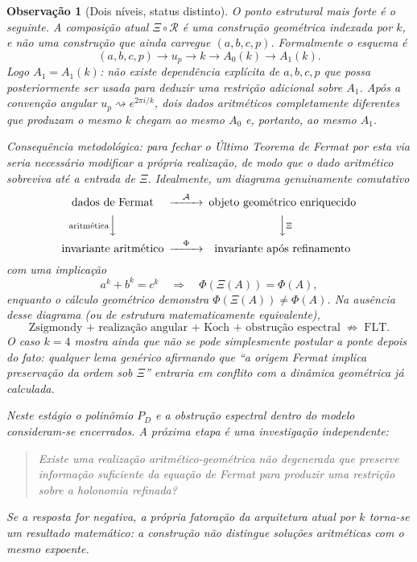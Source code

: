 \documentclass[11pt,a4paper]{article}
\newtheorem{observacao}[teorema]{Observação}
\begin{document}
\begin{observacao}[Dois níveis, status distinto]
O ponto estrutural mais forte é o seguinte. A composição atual \(\Xi\circ\mathcal{R}\) é uma construção geométrica indexada por \(k\), e não uma construção que ainda carregue \((a,b,c,p)\). Formalmente o esquema é
\[
(a,b,c,p)\longrightarrow u_p\longrightarrow k\longrightarrow A_0(k)\longrightarrow A_1(k).
\]
Logo \(A_1=A_1(k)\): não existe dependência explícita de \(a,b,c,p\) que possa posteriormente ser usada para deduzir uma restrição adicional sobre \(A_1\). Após a convenção angular \(u_p\rightsquigarrow e^{2\pi i/k}\), dois dados aritméticos completamente diferentes que produzam o mesmo \(k\) chegam ao mesmo \(A_0\) e, portanto, ao mesmo \(A_1\).

Consequência metodológica: para fechar o Último Teorema de Fermat por esta via seria necessário modificar a própria realização, de modo que o dado aritmético sobreviva até a entrada de \(\Xi\). Idealmente, um diagrama genuinamente comutativo
\[
\begin{CD}
\text{dados de Fermat}@>{\mathcal{A}}>>\text{objeto geométrico enriquecido}\\
@V{\text{aritmética}}VV@VV{\Xi}V\\
\text{invariante aritmético}@>{\Phi}>>\text{invariante após refinamento}
\end{CD}
\]
com uma implicação
\[
a^k+b^k=c^k\quad\Longrightarrow\quad\Phi(\Xi(A))=\Phi(A),
\]
enquanto o cálculo geométrico demonstra \(\Phi(\Xi(A))\neq\Phi(A)\). Na ausência desse diagrama (ou de estrutura matematicamente equivalente),
\[
\text{Zsigmondy + realização angular + Koch + obstrução espectral}\;\not\Rightarrow\;\text{FLT}.
\]
O caso \(k=4\) mostra ainda que não se pode simplesmente postular a ponte depois do fato: qualquer lema genérico afirmando que ``a origem Fermat implica preservação da ordem sob \(\Xi\)'' entraria em conflito com a dinâmica geométrica já calculada.

Neste estágio o polinômio \(P_D\) e a obstrução espectral dentro do modelo consideram-se encerrados. A próxima etapa é uma investigação independente:
\begin{quote}
Existe uma realização aritmético-geométrica não degenerada que preserve informação suficiente da equação de Fermat para produzir uma restrição sobre a holonomia refinada?
\end{quote}
Se a resposta for negativa, a própria fatoração da arquitetura atual por \(k\) torna-se um resultado matemático: a construção não distingue soluções aritméticas com o mesmo expoente.
\end{observacao}
\end{document}
